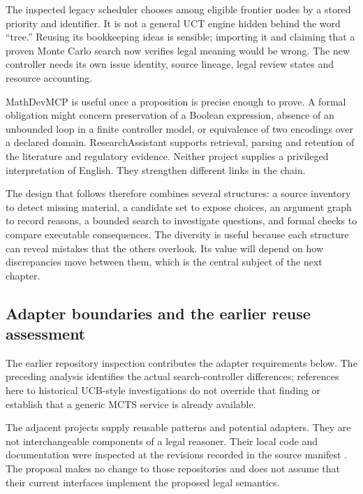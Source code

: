 The inspected legacy scheduler chooses among eligible frontier nodes by a stored
priority and identifier. It is not a general UCT engine hidden behind the word
``tree.'' Reusing its bookkeeping ideas is sensible; importing it and claiming
that a proven Monte Carlo search now verifies legal meaning would be wrong. The
new controller needs its own issue identity, source lineage, legal review states
and resource accounting.


MathDevMCP is useful once a proposition is precise enough to prove. A formal
obligation might concern preservation of a Boolean expression, absence of an
unbounded loop in a finite controller model, or equivalence of two encodings over
a declared domain. ResearchAssistant supports retrieval, parsing and retention
of the literature and regulatory evidence. Neither project supplies a privileged
interpretation of English. They strengthen different links in the chain.

The design that follows therefore combines several structures: a source inventory
to detect missing material, a candidate set to expose choices, an argument graph
to record reasons, a bounded search to investigate questions, and formal checks
to compare executable consequences. The diversity is useful because each
structure can reveal mistakes that the others overlook. Its value will depend on
how discrepancies move between them, which is the central subject of the next
chapter.

\subsection{Adapter boundaries and the earlier reuse assessment}

The earlier repository inspection contributes the adapter requirements below.
The preceding analysis identifies the actual search-controller differences;
references here to historical UCB-style investigations do not override that
finding or establish that a generic MCTS service is already available.


\label{merge:P-04-prototype:03}


The adjacent projects supply reusable patterns and potential adapters. They are
not interchangeable components of a legal reasoner. Their local code and
documentation were inspected at the revisions recorded in the source manifest
\citep{localrepos}. The proposal makes no change to those repositories and does
not assume that their current interfaces implement the proposed legal semantics.

